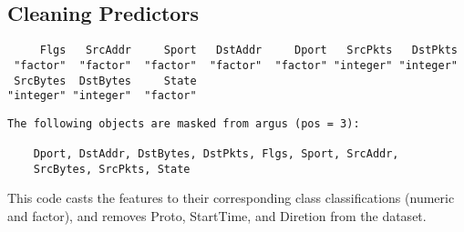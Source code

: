 \documentclass[12pt,twoside]{dukestatscithesis}
\theoremstyle{definition}
\theoremstyle{definition}
\theoremstyle{definition}
\theoremstyle{remark}
\begin{document}
\subsection{Cleaning Predictors}\label{cleaning-predictors}
\begin{Shaded}
\begin{Highlighting}[]
\end{Highlighting}
\end{Shaded}
\begin{verbatim}
     Flgs   SrcAddr     Sport   DstAddr     Dport   SrcPkts   DstPkts 
 "factor"  "factor"  "factor"  "factor"  "factor" "integer" "integer" 
 SrcBytes  DstBytes     State 
"integer" "integer"  "factor" 
\end{verbatim}
\begin{Shaded}
\begin{Highlighting}[]
\StringTok{ }
                   
                   
\StringTok{ } \NormalTok{(}\NormalTok{, }\NormalTok{, }\NormalTok{, }\NormalTok{, }\NormalTok{,}
                                \NormalTok{, }\NormalTok{, }\NormalTok{, }\NormalTok{, }\NormalTok{))}
\end{Highlighting}
\end{Shaded}
\begin{verbatim}
The following objects are masked from argus (pos = 3):

    Dport, DstAddr, DstBytes, DstPkts, Flgs, Sport, SrcAddr,
    SrcBytes, SrcPkts, State
\end{verbatim}
\begin{Shaded}
\begin{Highlighting}[]
\StringTok{ }\NormalTok{(}\NormalTok{, }\NormalTok{, }\NormalTok{, }\NormalTok{, }\NormalTok{, }\NormalTok{)}
\StringTok{ }\NormalTok{(}\NormalTok{, }\NormalTok{, }\NormalTok{, }\NormalTok{)}
\end{Highlighting}
\end{Shaded}
This code casts the features to their corresponding class
classifications (numeric and factor), and removes Proto, StartTime, and
Diretion from the dataset.
\end{document}
